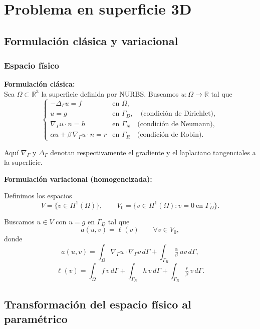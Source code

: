 \documentclass[12pt]{article}
\begin{document}
\section{Problema en superficie 3D}
\subsection{Formulación clásica y variacional}
\subsubsection*{Espacio físico}
\medskip
\textbf{Formulación clásica:\\}
    Sea $\Omega \subset \mathbb{R}^3$ la superficie definida por NURBS. 
Buscamos $u : \Omega \to \mathbb{R}$ tal que
\[
\begin{cases}
- \Delta_\Gamma u = f & \text{en } \Omega, \\[6pt]
u = g & \text{en } \Gamma_D, \quad \text{(condición de Dirichlet)}, \\[6pt]
\nabla_\Gamma u \cdot n = h & \text{en } \Gamma_N \quad \text{(condición de Neumann)}, \\[6pt]
\alpha u + \beta \, \nabla_\Gamma u \cdot n = r & \text{en } \Gamma_R 
\quad \text{(condición de Robin)}.
\end{cases}
\]

Aquí $\nabla_\Gamma$ y $\Delta_\Gamma$ denotan respectivamente el gradiente y el laplaciano tangenciales a la superficie.

\medskip

\textbf{Formulación variacional (homogeneizada):}

Definimos los espacios
\[
V = \{ v \in H^1(\Omega) \}, 
\qquad 
V_0 = \{ v \in H^1(\Omega) : v=0 \ \text{en } \Gamma_D \}.
\]

Buscamos $u \in V$ con $u=g$ en $\Gamma_D$ tal que
\[
a(u,v) = \ell(v) \qquad \forall v \in V_0,
\]
donde
\[
a(u,v) = \int_\Omega \nabla_\Gamma u \cdot \nabla_\Gamma v \, d\Gamma
          + \int_{\Gamma_R} \tfrac{\alpha}{\beta}\, u v \, d\Gamma,
\]
\[
\ell(v) = \int_\Omega f \, v \, d\Gamma 
          + \int_{\Gamma_N} h \, v \, d\Gamma
          + \int_{\Gamma_R} \tfrac{r}{\beta}\, v \, d\Gamma.
\]

\subsection{Transformación del espacio físico al paramétrico}
\end{document}
